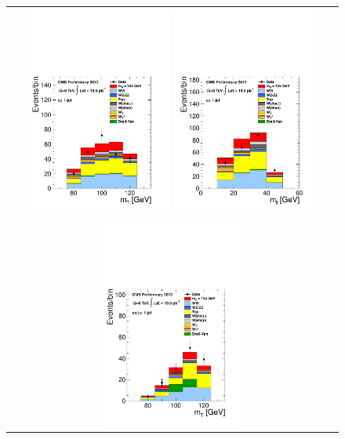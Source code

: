 %
\begin{figure}[htp] 
\centering 
\begin{tabular}{c} 
\includegraphics[width=0.45\textwidth]{figures/hww_analysis17_125_ALL_of_1j_mt.pdf}
\includegraphics[width=0.45\textwidth]{figures/hww_analysis17_125_ALL_of_1j_mll.pdf} 
\\
\includegraphics[width=0.45\textwidth]{figures/hww_analysis17_125_ALL_sf_1j_mt.pdf}

\end{tabular}
\end{figure}
